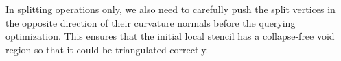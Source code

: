 In splitting operations only, we also need to carefully push the split vertices in the opposite direction of their curvature normals before the querying optimization. This ensures that the initial local stencil has a collapse-free void region so that it could be triangulated correctly.
%



